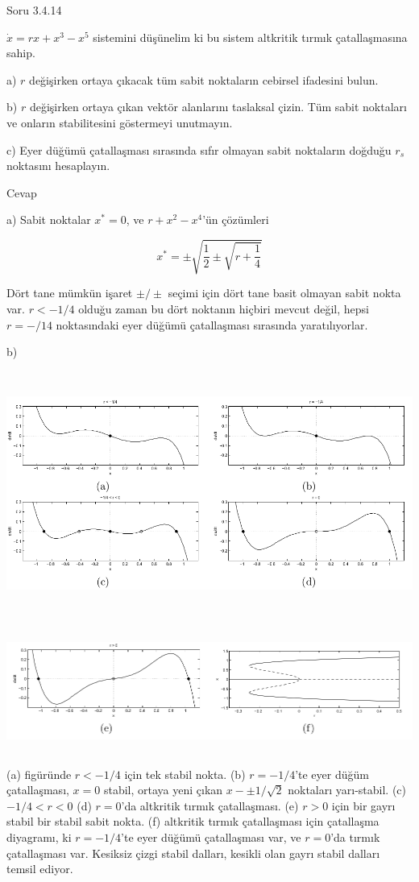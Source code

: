 \documentclass[12pt,fleqn]{article}\usepackage{../../common}
\begin{document}
Soru 3.4.14

$\dot{x} = rx + x^3 - x^5$ sistemini düşünelim ki bu sistem altkritik tırmık
çatallaşmasına sahip.

a) $r$ değişirken ortaya çıkacak tüm sabit noktaların cebirsel ifadesini bulun.

b) $r$ değişirken ortaya çıkan vektör alanlarını taslaksal çizin. Tüm sabit
noktaları ve onların stabilitesini göstermeyi unutmayın.

c) Eyer düğümü çatallaşması sırasında sıfır olmayan sabit noktaların doğduğu
$r_s$ noktasını hesaplayın.

Cevap

a) Sabit noktalar $x^*=0$, ve  $r + x^2 - x^4$'ün çözümleri

$$ x^* = \pm \sqrt{ \frac{1}{2} \pm \sqrt{r + \frac{1}{4}} }  $$

Dört tane mümkün işaret $\pm/\pm$ seçimi için dört tane basit olmayan sabit
nokta var. $r<-1/4$ olduğu zaman bu dört noktanın hiçbiri mevcut değil, hepsi
$r=-/14$ noktasındaki eyer düğümü çatallaşması sırasında yaratılıyorlar. 

b)

\includegraphics[height=8cm]{08_06.png}

\includegraphics[height=4cm]{08_07.png}

(a) figüründe $r<-1/4$ için tek stabil nokta. (b) $r=-1/4$'te eyer düğüm
çatallaşması, $x=0$ stabil, ortaya yeni çıkan $x - \pm 1/\sqrt{2}$ noktaları
yarı-stabil. (c) $-1/4 < r < 0$ (d) $r=0$'da altkritik tırmık çatallaşması. (e)
$r>0$ için bir gayrı stabil bir stabil sabit nokta. (f) altkritik tırmık
çatallaşması için çatallaşma diyagramı, ki $r=-1/4$'te eyer düğümü çatallaşması
var, ve $r=0$'da tırmık çatallaşması var. Kesiksiz çizgi stabil dalları, kesikli
olan gayrı stabil dalları temsil ediyor. 
\end{document}
